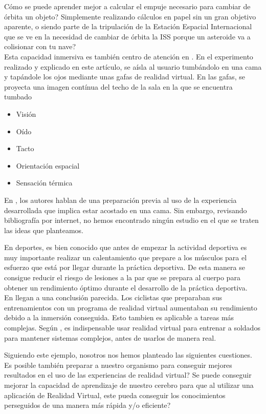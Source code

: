 \documentclass[twoside,twocolumn]{article}
\begin{document}
Cómo se puede aprender mejor a calcular el empuje necesario para cambiar de órbita un objeto? Simplemente realizando cálculos en papel sin un gran objetivo aparente, o siendo parte de la tripulación de la Estación Espacial Internacional que se ve en la necesidad de cambiar de órbita la ISS porque un asteroide va a colisionar con tu nave?\\

Esta capacidad inmersiva es también centro de atención en \cite{Presence}. En el experimento realizado y explicado en este artículo, se aísla al usuario tumbándolo en una cama y tapándole los ojos mediante unas gafas de realidad virtual. En las gafas, se proyecta una imagen contínua del techo de la sala en la que se encuentra tumbado

\begin{itemize}
\item Visión
\item Oído
\item Tacto
\item Orientación espacial
\item Sensación térmica
\end{itemize}

En \cite{Presence}, los autores hablan de una preparación previa al uso de la experiencia desarrollada que implica estar acostado en una cama. Sin embargo, revisando bibliografía por internet, no hemos encontrado ningún estudio en el que se traten las ideas que planteamos.

En deportes, es bien conocido que antes de empezar la actividad deportiva es muy importante realizar un calentamiento que prepare a los músculos para el esfuerzo que está por llegar durante la práctica deportiva. De esta manera se consigue reducir el riesgo de lesiones a la par que se prepara al cuerpo para obtener un rendimiento óptimo durante el desarrollo de la práctica deportiva.\\

En \cite{Preparation} llegan a una conclusión parecida. Los ciclistas que preparaban sus entrenamientos con un programa de realidad virtual aumentaban su rendimiento debido a la inmersión conseguida. Esto tambien es aplicable a tareas más complejas. Según \cite{Army}, es indispensable usar realidad virtual para entrenar a soldados para mantener sistemas complejos, antes de usarlos de manera real.

Siguiendo este ejemplo, nosotros nos hemos planteado las siguientes cuestiones. Es posible también preparar a nuestro organismo para conseguir mejores resultados en el uso de las experiencias de realidad virtual? Se puede conseguir mejorar la capacidad de aprendizaje de nuestro cerebro para que al utilizar una aplicación de Realidad Virtual, este pueda conseguir los conocimientos perseguidos de una manera más rápida y/o eficiente?
\end{document}
